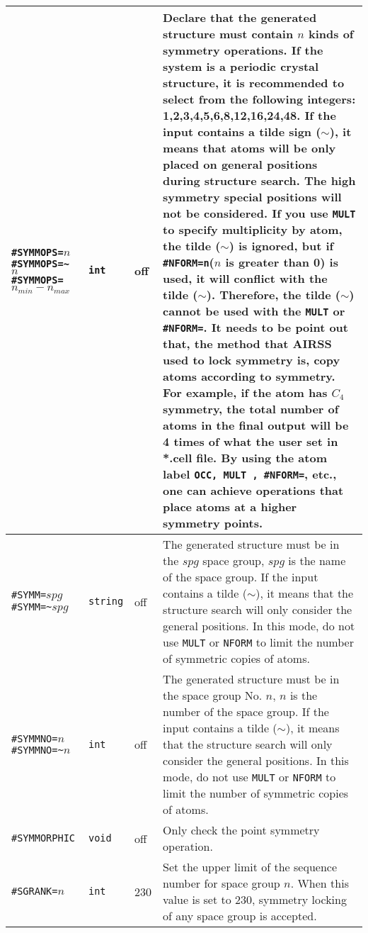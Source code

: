 \documentclass[a4paper, 10pt]{article}
\begin{document}
\begin{center}
\begin{longtable}{m{11em}|m{4em}<{\centering}|m{3em}<{\centering}|m{15em}}
\verb|#SYMMOPS=|\(n\)\hspace{6em}\verb|#SYMMOPS=~|\(n\;\;\;\;\;\;\;\;\;\;\;\)\hspace{6em}\verb|#SYMMOPS=|\(n_{min}-n_{max}\) & \verb|int| &  off & Declare that the generated structure must contain \(n\) kinds of symmetry operations. If the system is a periodic crystal structure, it is recommended to select from the following integers: 1,2,3,4,5,6,8,12,16,24,48. If the input contains a tilde sign (\(\sim\)), it means that atoms will be only placed on general positions during structure search. The high symmetry special positions will not be considered. If you use \verb|MULT| to specify multiplicity by atom, the tilde (\(\sim\)) is ignored, but if \verb|#NFORM=n|(\(n\) is greater than 0) is used, it will conflict with the tilde (\(\sim\)). Therefore, the tilde (\(\sim\)) cannot be used with the \verb|MULT| or \verb|#NFORM=|. \textbf{It needs to be point out that,} the method that AIRSS used to lock symmetry is, copy atoms according to symmetry. For example, if the atom has \(C_4\) symmetry, the total number of atoms in the final output will be 4 times of what the user set in *.cell file. By using the atom label \verb|OCC, MULT , #NFORM=|, etc., one can achieve operations that place atoms at a higher symmetry points.\\
\midrule
\verb|#SYMM=|\(spg\)\hspace{6em} \verb|#SYMM=~|\(spg\)& \verb|string| & off & The generated structure must be in the \(spg\) space group, \(spg\) is the name of the space group. If the input contains a tilde (\(\sim\)), it means that the structure search will only consider the general positions. In this mode, do not use \verb|MULT| or \verb|NFORM| to limit the number of symmetric copies of atoms.\\
\midrule
\verb|#SYMMNO=|\(n\)\hspace{6em} \verb|#SYMMNO=~|\(n\) & \verb|int| & off & The generated structure must be in the space group No. \(n\), \(n\) is the number of the space group. If the input contains a tilde (\(\sim\)), it means that the structure search will only consider the general positions. In this mode, do not use \verb|MULT| or \verb|NFORM| to limit the number of symmetric copies of atoms.\\
\midrule
\verb|#SYMMORPHIC| & \verb|void| & off & Only check the point symmetry operation.\\
\midrule
\verb|#SGRANK=|\(n\) & \verb|int| & 230 & Set the upper limit of the sequence number for space group \(n\). When this value is set to 230, symmetry locking of any space group is accepted.\\

\end{longtable}
\end{center}
\end{document}
